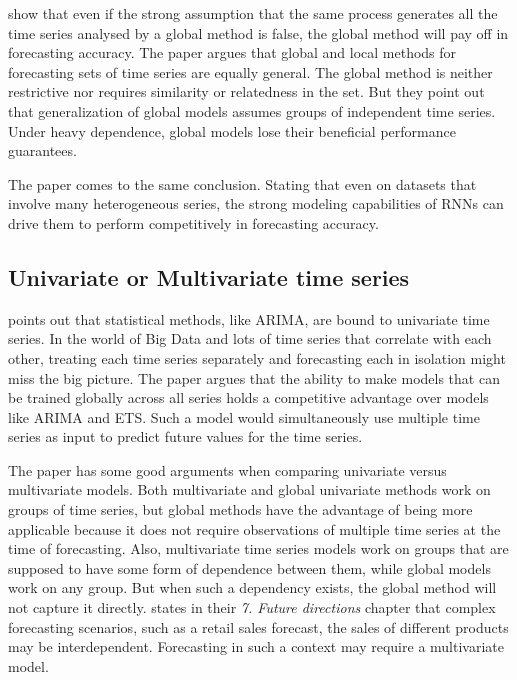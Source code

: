 


\cite{Rabanser2020} show that even if the strong assumption that the same process generates all the time series analysed by a global
method is false, the global method will pay off in forecasting accuracy.
The paper argues that global and local methods for forecasting
sets of time series are equally general. The global method is neither restrictive nor requires
similarity or relatedness in the set.
But they point out that generalization of global models assumes groups of independent time series.
Under heavy dependence, global models lose their beneficial performance guarantees.

The paper \cite{Hewamalage2021} comes to the same conclusion. Stating that
even on datasets that involve many heterogeneous series, the strong modeling capabilities of RNNs can drive
them to perform competitively in forecasting accuracy.

\subsection{Univariate or Multivariate time series}
\cite{Bandara2017} points out that statistical methods, like ARIMA, are bound to
univariate time series. In the world of Big Data and lots of time series that correlate with each other,
treating each time series separately and forecasting each in isolation might miss the big picture.
The paper argues that the ability to make models that can be trained globally across all series
holds a competitive advantage over models like ARIMA and ETS.
Such a model would simultaneously use multiple time series as input to predict future values for the time series.

The paper \cite{Rabanser2020} has some good arguments when comparing univariate versus multivariate models.
Both multivariate and global univariate methods work on groups of time series, but global methods
have the advantage of being more applicable because it does not require observations of multiple
time series at the time of forecasting.
Also, multivariate time series models work on groups that are supposed to have some form of
dependence between them, while global models work on any group.
But when such a dependency exists, the global method will not capture it directly.
\cite{Hewamalage2021} states in their \textit{7. Future directions} chapter that complex
forecasting scenarios, such as a retail sales forecast, the sales of different products
may be interdependent.
Forecasting in such a context may require a multivariate model.

